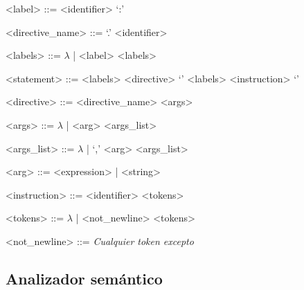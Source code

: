\begin{tcolorbox}[enhanced jigsaw,breakable,top=4mm]
    \begin{grammar}
       <label> ::= <identifier> `:'

       <directive\_name> ::= `.' <identifier>

       <labels> ::= $\lambda$ | <label> <labels>

       <statement> ::= <labels> <directive> `\EOL'
                  \alt <labels> <instruction> `\EOL'

       <directive> ::= <directive\_name> <args>
       
       <args> ::= $\lambda$ | <arg> <args\_list>

       <args\_list> ::= $\lambda$ | `,' <arg> <args\_list>

       <arg> ::= <expression> | <string>

       <instruction> ::= <identifier> <tokens>

       <tokens> ::= $\lambda$ | <not\_newline> <tokens>

       <not\_newline> ::= \textit{Cualquier token excepto \verbEOL}
    \end{grammar}
\end{tcolorbox}

\subsection{Analizador semántico}
